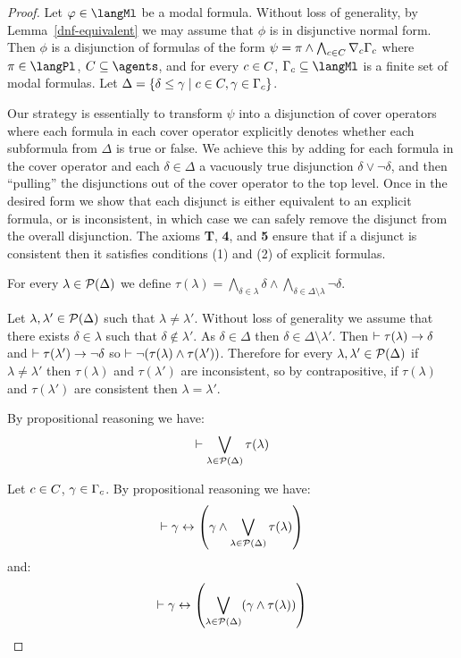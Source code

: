 \begin{proof}
Let $\phi \in \langMl$ be a modal formula.
Without loss of generality, by Lemma~\ref{dnf-equivalent} we may assume that $\phi$ is in disjunctive normal form.
Then $\phi$ is a disjunction of formulas of the form $\psi = \pi \land \bigwedge_{c \in C} \nabla_{c} \Gamma_c$ where $\pi \in \langPl$, $\agentsC \subseteq \agents$, and for every $c \in C$, $\Gamma_\agentC \subseteq \langMl$ is a finite set of modal formulas.
Let $\Delta = \{\delta \leq \gamma \mid c \in C, \gamma \in \Gamma_c\}$.

Our strategy is essentially to transform $\psi$ into a disjunction of cover operators where each formula in each cover operator explicitly denotes whether each subformula from $\Delta$ is true or false.
We achieve this by adding for each formula in the cover operator and each $\delta \in \Delta$ a vacuously true disjunction $\delta \lor \lnot \delta$, and then ``pulling'' the disjunctions out of the cover operator to the top level.
Once in the desired form we show that each disjunct is either equivalent to an explicit formula, or is inconsistent, in which case we can safely remove the disjunct from the overall disjunction.
The \axiomS{} axioms {\bf T}, {\bf 4}, and {\bf 5} ensure that if a disjunct is consistent then it satisfies conditions (1) and (2) of explicit formulas.

For every $\lambda \in \mathcal{P}(\Delta)$ we define $\tau(\lambda) = \bigwedge_{\delta \in \lambda} \delta \land \bigwedge_{\delta \in \Delta \setminus \lambda} \lnot \delta$.

Let $\lambda, \lambda' \in \mathcal{P}(\Delta)$ such that $\lambda \neq \lambda'$.
Without loss of generality we assume that there exists $\delta \in \lambda$ such that $\delta \notin \lambda'$.
As $\delta \in \Delta$ then $\delta \in \Delta \setminus \lambda'$.
Then $\vdash \tau(\lambda) \rightarrow \delta$ and $\vdash \tau(\lambda') \rightarrow \lnot \delta$ so $\vdash \lnot (\tau(\lambda) \land \tau(\lambda'))$.
Therefore for every $\lambda, \lambda' \in \mathcal{P}(\Delta)$ if $\lambda \neq \lambda'$ then $\tau(\lambda)$ and $\tau(\lambda')$ are inconsistent,
so by contrapositive, if $\tau(\lambda)$ and $\tau(\lambda')$ are consistent then $\lambda = \lambda'$.

By propositional reasoning we have:
$$
\vdash \bigvee_{\lambda \in \mathcal{P}(\Delta)} \tau(\lambda)
$$

Let $c \in C$, $\gamma \in \Gamma_c$.
By propositional reasoning we have:
$$
\vdash \gamma \leftrightarrow \left(\gamma \land \bigvee_{\lambda \in \mathcal{P}(\Delta)} \tau(\lambda)\right)
$$
and:
$$
\vdash \gamma \leftrightarrow \left(\bigvee_{\lambda \in \mathcal{P}(\Delta)} (\gamma \land \tau(\lambda))\right)
$$


\end{proof}
